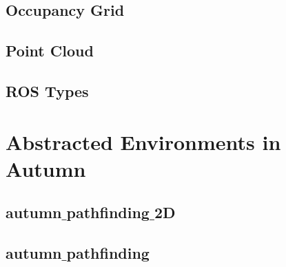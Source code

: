\subsection{Occupancy Grid}

\subsection{Point Cloud}

\subsection{ROS Types}

\section{Abstracted Environments in Autumn}

\subsection{autumn$\_$pathfinding$\_$2D}

\subsection{autumn$\_$pathfinding}